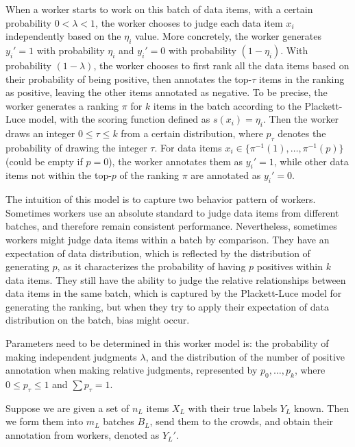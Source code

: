 When a worker starts to work on this batch of data items, 
with a certain probability $0 < \lambda < 1$, 
the worker chooses to judge each data item $x_i$ independently based on the $\eta_i$ value.  
More concretely, the worker generates $y_i' = 1$ with probability $\eta_i$ and $y_i' = 0$ with probability $(1 - \eta_i)$.  
With probability $(1 - \lambda)$, the worker chooses to first rank all the data items based on their probability of being positive, 
then annotates the top-$\tau$ items in the ranking as positive, leaving the other items annotated as negative.  
To be precise, the worker generates a ranking $\pi$ for $k$ items in the batch according to the Plackett-Luce model, 
with the scoring function defined as $s(x_i) = \eta_i$.  
Then the worker draws an integer $0 \leq \tau \leq k$ from a certain distribution, 
where $p_\tau$ denotes the probability of drawing the integer $\tau$.    
For data items $x_i \in \{\pi^{-1}(1), \ldots, \pi^{-1}(p)\}$ (could be empty if $p = 0$), the worker annotates them as $y_i'=1$, 
while other data items not within the top-$p$ of the ranking $\pi$ are annotated as $y_i' = 0$.

The intuition of this model is to capture two behavior pattern of workers.  
Sometimes workers use an absolute standard to judge data items from different batches, 
and therefore remain consistent performance.  
Nevertheless, sometimes workers might judge data items within a batch by comparison.  
They have an expectation of data distribution, 
which is reflected by the distribution of generating $p$, 
as it characterizes the probability of having $p$ positives within $k$ data items.   
They still have the ability to judge the relative relationships between data items in the same batch,
which is captured by the Plackett-Luce model for generating the ranking, 
but when they try to apply their expectation of data distribution on the batch, 
bias might occur.  


Parameters need to be determined in this worker model is:
the probability of making independent judgments $\lambda$, 
and the distribution of the number of positive annotation when making relative judgments, 
represented by $p_0, \ldots, p_k$, where $0 \leq p_{\tau} \leq 1$ and $\sum p_{\tau} = 1$.  

Suppose we are given a set of $n_L$ items $X_L$ with their true labels $Y_L$ known.  
Then we form them into $m_L$ batches $B_L$, send them to the crowds, 
and obtain their annotation from workers, denoted as $Y_L'$.  


